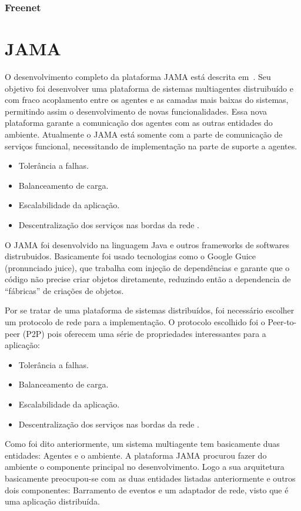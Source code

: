 \subsubsection{Freenet}


\section{JAMA}

O desenvolvimento completo da plataforma JAMA está descrita em~\cite{parise11}. Seu objetivo foi desenvolver uma plataforma de sistemas multiagentes distruibuído e com fraco acoplamento entre os agentes e as camadas mais baixas do sistemas, permitindo assim o desenvolvimento de novas funcionalidades. Essa nova plataforma garante a comunicação dos agentes com as outras entidades do ambiente. Atualmente o JAMA está somente com a parte de comunicação de serviços funcional, necessitando de implementação na parte de suporte a agentes.
\begin{itemize}
	\item Tolerância a falhas.
	\item Balanceamento de carga.
	\item Escalabilidade da aplicação.
	\item Descentralização dos serviços nas bordas da rede	.
\end{itemize}


O JAMA foi desenvolvido na linguagem Java e outros frameworks de softwares distrubuidos. Basicamente foi usado tecnologias como o Google Guice (pronunciado juice), que trabalha com injeção de dependências e garante que o código não precise criar objetos diretamente, reduzindo então a dependencia de ``fábricas'' de criações de objetos.

Por se tratar de uma plataforma de sistemas distribuídos, foi necessário escolher um protocolo de rede para a implementação. O protocolo escolhido foi o Peer-to-peer (P2P) pois oferecem uma série de propriedades interessantes para a aplicação:
\begin{itemize}
	\item Tolerância a falhas.
	\item Balanceamento de carga.
	\item Escalabilidade da aplicação.
	\item Descentralização dos serviços nas bordas da rede	.
\end{itemize}

Como foi dito anteriormente, um sistema multiagente tem basicamente duas entidades: Agentes e o ambiente. A plataforma JAMA procurou fazer do ambiente o componente principal no desenvolvimento. Logo a sua arquitetura basicamente preocupou-se com as duas entidades listadas anteriormente e outros dois componentes: Barramento de eventos e um adaptador de rede, visto que é uma aplicação distribuída.

